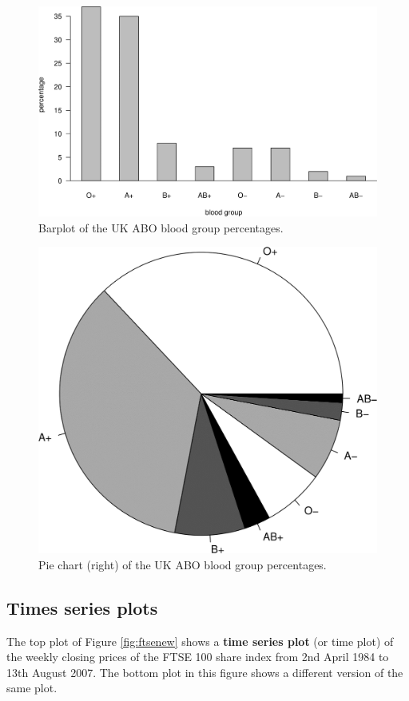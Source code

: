 \documentclass[
  11pt,
  british,
  openany, a4paper]{book}
\begin{document}
\begin{figure}

{\centering \includegraphics[width=0.6\linewidth]{images/ABO_barplots} 

}

\caption{Barplot of the UK ABO blood group percentages.}\label{fig:ABObar}
\end{figure}

\begin{figure}

{\centering \includegraphics[width=0.75\linewidth]{images/ABO_pie} 

}

\caption{Pie chart (right) of the UK ABO blood group percentages.}\label{fig:ABOpie}
\end{figure}

\hypertarget{times-series-plots}{%
\subsection{Times series plots}\label{times-series-plots}}

The top plot of Figure \ref{fig:ftsenew} shows a \textbf{time series plot} (or time plot) of the weekly closing prices of the FTSE 100 share index from 2nd April 1984 to 13th August 2007. The bottom plot in this figure shows a different version of the same plot.
\end{document}
